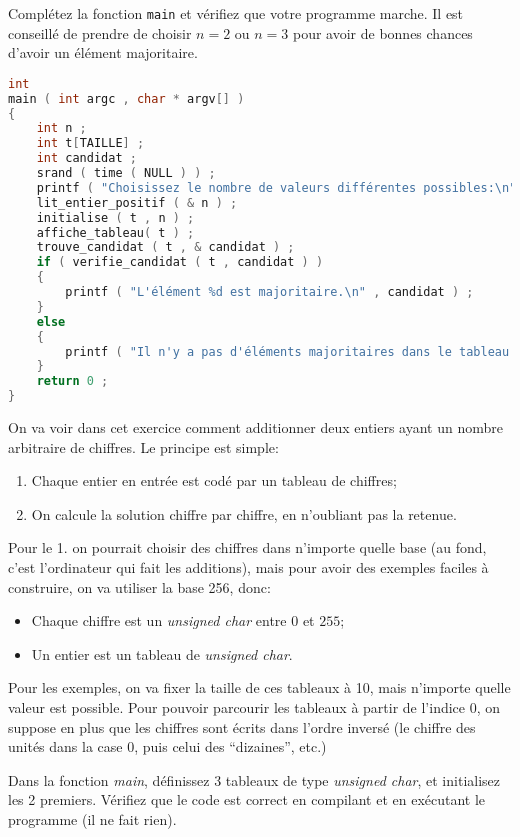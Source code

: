 \question Complétez la fonction \texttt{main} et vérifiez que votre programme marche. Il est conseillé de prendre de choisir \(n=2\) ou \(n=3\) pour avoir de bonnes chances d'avoir un élément majoritaire.

\begin{solutioncachee}
  \begin{lstlisting}[language=C]
int 
main ( int argc , char * argv[] )
{
    int n ;
    int t[TAILLE] ;
    int candidat ;
    srand ( time ( NULL ) ) ;
    printf ( "Choisissez le nombre de valeurs différentes possibles:\n" ) ;
    lit_entier_positif ( & n ) ;
    initialise ( t , n ) ;
    affiche_tableau( t ) ;
    trouve_candidat ( t , & candidat ) ;
    if ( verifie_candidat ( t , candidat ) )
    {
        printf ( "L'élément %d est majoritaire.\n" , candidat ) ;
    }
    else
    {
        printf ( "Il n'y a pas d'éléments majoritaires dans le tableau.\n") ;
    }
    return 0 ;
}
  \end{lstlisting}
\end{solutioncachee}


On va voir dans cet exercice comment additionner deux entiers
ayant un nombre arbitraire de chiffres. Le principe est simple:
\begin{enumerate}
\item Chaque entier en entrée est codé par un tableau de chiffres;
\item On calcule la solution chiffre par chiffre, en n'oubliant pas 
  la retenue.
\end{enumerate}

Pour le 1. on pourrait choisir des chiffres dans n'importe quelle base
(au fond, c'est l'ordinateur qui fait les additions), mais pour avoir
des exemples faciles à construire, on va utiliser la base 256, donc:
\begin{itemize}
\item Chaque chiffre est un \emph{unsigned char} entre \(0\) et \(255\);
\item Un entier est un tableau de \emph{unsigned char}.
\end{itemize}
Pour les exemples, on va fixer la taille de ces tableaux à 10, mais
n'importe quelle valeur est possible. Pour pouvoir parcourir les
tableaux à partir de l'indice 0, on suppose en plus que les chiffres
sont écrits dans l'ordre inversé (le chiffre des unités dans la case
0, puis celui des ``dizaines'', etc.)

\question Dans la fonction \emph{main}, définissez 3 tableaux de type
\emph{unsigned char}, et initialisez les 2 premiers. Vérifiez que le
code est correct en compilant et en exécutant le programme (il ne fait
rien).
